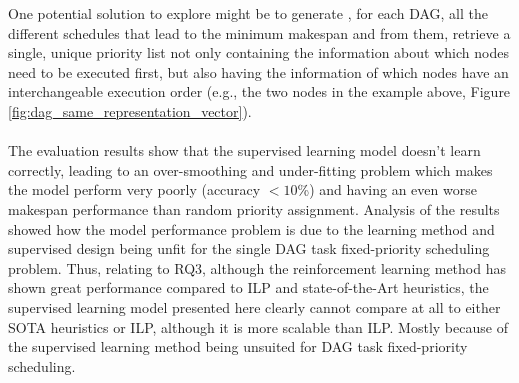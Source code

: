 One potential solution to explore might be to generate
, for each DAG, all the different schedules that lead to the minimum
makespan and from them, retrieve a single, unique priority list
not only containing the information about which nodes need to be
executed first, but also having the information of which nodes
have an interchangeable execution order 
(e.g., the two nodes in the example above, Figure \ref{fig:dag_same_representation_vector}).
\\\\

The evaluation results show that the supervised learning model
doesn't learn correctly, leading to an over-smoothing and under-fitting problem
which makes the model perform very poorly (accuracy $<10$\%)
and having an even worse makespan performance than random priority assignment.
Analysis of the results showed how the model performance problem
is due to the learning method and supervised design being unfit for
the single DAG task fixed-priority scheduling problem.
Thus, relating to RQ3, although the reinforcement learning
method has shown great performance compared to ILP\cite{Zhao2024GATDRLmodel}
and state-of-the-Art heuristics\cite{Lee2021GlobalDagSchedDRL},
the supervised learning model presented here 
clearly cannot compare at all to either SOTA heuristics
or ILP, although it is more scalable than ILP. 
Mostly because of the supervised learning method being unsuited 
for DAG task fixed-priority scheduling.